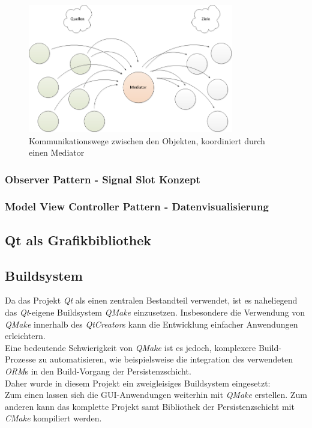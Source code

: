 \begin{figure}[htp!]
	\includegraphics[width=0.8\textwidth]{mediated}
	\caption{Kommunikationswege zwischen den Objekten, koordiniert durch einen Mediator}
	\label{strukturiert}
\end{figure}
\subsubsection{Observer Pattern - Signal Slot Konzept}
\subsubsection{Model View Controller Pattern - Datenvisualisierung}

\subsection{Qt als Grafikbibliothek}

\newpage

\subsection{Buildsystem}
Da das Projekt \textit{Qt} als einen zentralen Bestandteil verwendet, ist es naheliegend das \textit{Qt}-eigene Buildsystem \textit{QMake} einzusetzen. Insbesondere die Verwendung von \textit{QMake} innerhalb des \textit{QtCreator}s kann die Entwicklung einfacher Anwendungen erleichtern.\\
Eine bedeutende Schwierigkeit von \textit{QMake} ist es jedoch, komplexere Build-Prozesse zu automatisieren, wie beispielsweise die integration des verwendeten \textit{ORM}s in den Build-Vorgang der Persistenzschicht.\\
Daher wurde in diesem Projekt ein zweigleisiges Buildsystem eingesetzt:\\
Zum einen lassen sich die GUI-Anwendungen weiterhin mit \textit{QMake} erstellen. Zum anderen kann das komplette Projekt samt Bibliothek der Persistenzschicht mit \textit{CMake} kompiliert werden.\\

